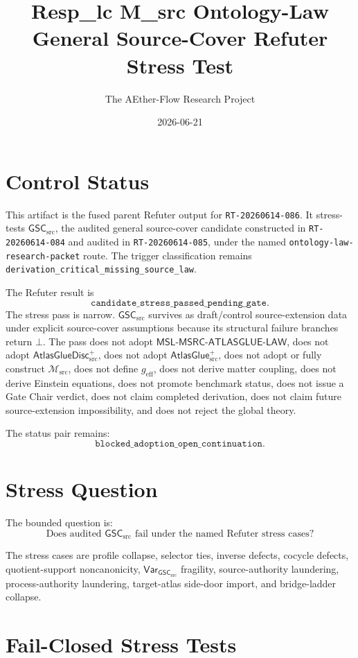 \documentclass[11pt]{article}
\title{Resp\_lc M\_src Ontology-Law General Source-Cover Refuter Stress Test}
\author{The AEther-Flow Research Project}
\date{2026-06-21}
\newcommand{\Msrc}{\mathcal{M}_{\mathrm{src}}}
\newcommand{\geff}{g_{\mathrm{eff}}}
\newcommand{\AtlasGlue}{\mathsf{AtlasGlue}_{\mathrm{src}}^{+}}
\newcommand{\AtlasGlueDisc}{\mathsf{AtlasGlueDisc}_{\mathrm{src}}^{+}}
\newcommand{\MSL}{\mathsf{MSL}\mbox{-}\mathsf{MSRC}\mbox{-}\mathsf{ATLASGLUE}\mbox{-}\mathsf{LAW}}
\newcommand{\GSC}{\mathsf{GSC}_{\mathrm{src}}}
\newcommand{\Vargsc}{\mathsf{Var}_{\GSC}}
\newcommand{\Bot}{\bot}
\begin{document}
\maketitle

\section*{Control Status}

This artifact is the fused parent Refuter output for
\texttt{RT-20260614-086}. It stress-tests \(\GSC\), the audited general
source-cover candidate constructed in \texttt{RT-20260614-084} and audited in
\texttt{RT-20260614-085}, under the named
\texttt{ontology-law-research-packet} route. The trigger classification
remains \texttt{derivation\_critical\_missing\_source\_law}.

The Refuter result is
\[
  \texttt{candidate\_stress\_passed\_pending\_gate}.
\]
The stress pass is narrow. \(\GSC\) survives as draft/control
source-extension data under explicit source-cover assumptions because its
structural failure branches return \(\Bot\). The pass does not adopt
\(\MSL\), does not adopt \(\AtlasGlueDisc\), does not adopt \(\AtlasGlue\),
does not adopt or fully construct \(\Msrc\), does not define \(\geff\), does
not derive matter coupling, does not derive Einstein equations, does not
promote benchmark status, does not issue a Gate Chair verdict, does not claim
completed derivation, does not claim future source-extension impossibility,
and does not reject the global theory.

The status pair remains:
\[
  \texttt{blocked\_adoption\_open\_continuation}.
\]

\section{Stress Question}

The bounded question is:
\[
\text{Does audited }\GSC\text{ fail under the named Refuter stress cases?}
\]

The stress cases are profile collapse, selector ties, inverse defects, cocycle
defects, quotient-support noncanonicity, \(\Vargsc\) fragility,
source-authority laundering, process-authority laundering, target-atlas
side-door import, and bridge-ladder collapse.

\section{Fail-Closed Stress Tests}
\end{document}
